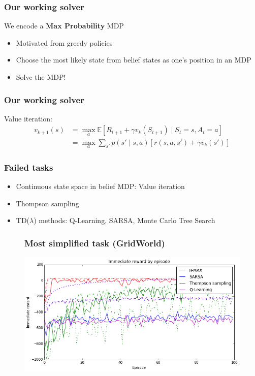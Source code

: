 \documentclass[10pt, compress]{beamer}
\begin{document}

\begin{frame}[fragile]
  \frametitle{Our working solver}
  We encode a \textbf{Max Probability} MDP
  \begin{itemize}
  \item Motivated from greedy policies
  \item Choose the most likely state from belief states as one's position in an
  MDP
  \item Solve the MDP!
  \end{itemize}
\end{frame}

\begin{frame}[fragile]
  \frametitle{Our working solver}
  Value iteration:
  \begin{align*}
  v_{k+1}(s) &= \max_a \mathbb{E}[R_{t+1} + \gamma v_k(S_{t+1}) \mid S_t = s, A_t = a] \\
  &= \max_a \sum_{s'} p(s' \mid s,a) [r(s,a,s') + \gamma v_k(s')]
  \end{align*}
\end{frame}

\begin{frame}[fragile]
  \frametitle{Failed tasks}

  \begin{itemize}
  \item Continuous state space in belief MDP: Value iteration
  \item Thompson sampling
  \item TD($\lambda$) methods: Q-Learning, SARSA, Monte Carlo Tree Search
  \end{itemize}
\end{frame}

\begin{frame}
\begin{figure}[ht]
  \frametitle{Most simplified task (GridWorld)}
  \vspace{3ex}
  \begin{center}
  \centerline{\includegraphics[width=1.1\textwidth]{img/mdp_imm_rewards.png}}
  \end{center}
  \end{figure}
\end{frame}
\end{document}
